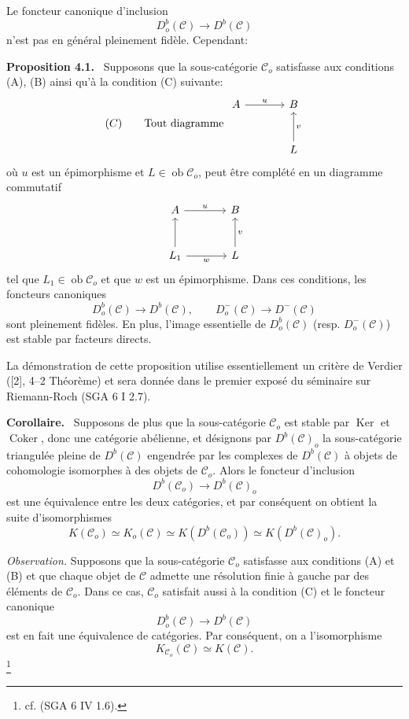 \documentclass[11pt]{article}
\newenvironment{statement}[1]{\par\medskip\noindent\textbf{#1.}\ }{\par\medskip}
\providecommand{\Ker}{\operatorname{Ker}}
\providecommand{\Coker}{\operatorname{Coker}}
\providecommand{\Ob}{\operatorname{ob}}
\providecommand{\cC}{\mathcal C}
\providecommand{\Ker}{\operatorname{Ker}}
\providecommand{\Coker}{\operatorname{Coker}}
\providecommand{\Ker}{\operatorname{Ker}}
\providecommand{\Coker}{\operatorname{Coker}}
\providecommand{\Ob}{\operatorname{ob}}
\providecommand{\cC}{\mathcal C}
\providecommand{\Ob}{\operatorname{Ob}}
\providecommand{\Ob}{\operatorname{ob}}
\providecommand{\Ob}{\operatorname{Ob}}
\begin{document}
Le foncteur canonique d'inclusion
\[
D_o^b(\cC)\longrightarrow D^b(\cC)
\]
n'est pas en général pleinement fidèle. Cependant:

\begin{statement}{Proposition 4.1}
Supposons que la sous-catégorie $\cC_o$ satisfasse aux conditions (A), (B) ainsi qu'à la condition (C) suivante:
\[
(C)\qquad
\text{Tout diagramme }
\begin{tikzcd}[column sep=large,row sep=large]
A \arrow[r,"u"]&B\\
&L \arrow[u,"v"']
\end{tikzcd}
\]
où $u$ est un épimorphisme et $L\in\Ob\cC_o$, peut être complété en un diagramme commutatif
\[
\begin{tikzcd}[column sep=large,row sep=large]
A \arrow[r,"u"]&B\\
L_1 \arrow[u] \arrow[r,"w"']&L \arrow[u,"v"']
\end{tikzcd}
\]
tel que $L_1\in\Ob\cC_o$ et que $w$ est un épimorphisme. Dans ces conditions, les foncteurs canoniques
\[
D_o^b(\cC)\longrightarrow D^b(\cC),\qquad
D_o^-(\cC)\longrightarrow D^-(\cC)
\]
sont pleinement fidèles. En plus, l'image essentielle de $D_o^b(\cC)$ (resp. $D_o^-(\cC)$) est stable par facteurs directs.
\end{statement}

La démonstration de cette proposition utilise essentiellement un critère de Verdier ([2], 4--2 Théorème) et sera donnée dans le premier exposé du séminaire sur Riemann-Roch (SGA 6 I 2.7).

\begin{statement}{Corollaire}
Supposons de plus que la sous-catégorie $\cC_o$ est stable par $\Ker$ et $\Coker$, donc une catégorie abélienne, et désignons par $D^b(\cC)_o$ la sous-catégorie triangulée pleine de $D^b(\cC)$ engendrée par les complexes de $D^b(\cC)$ à objets de cohomologie isomorphes à des objets de $\cC_o$. Alors le foncteur d'inclusion
\[
D^b(\cC_o)\longrightarrow D^b(\cC)_o
\]
est une équivalence entre les deux catégories, et par conséquent on obtient la suite d'isomorphismes
\[
K(\cC_o)\simeq K_o(\cC)\simeq K(D^b(\cC_o))\simeq K(D^b(\cC)_o).
\tag{*}
\]
\end{statement}

\emph{Observation.} Supposons que la sous-catégorie $\cC_o$ satisfasse aux conditions (A) et (B) et que chaque objet de $\cC$ admette une résolution finie à gauche par des éléments de $\cC_o$. Dans ce cas, $\cC_o$ satisfait aussi à la condition (C) et le foncteur canonique
\[
D_o^b(\cC)\longrightarrow D^b(\cC)
\]
est en fait une équivalence de catégories. Par conséquent, on a l'isomorphisme
\[
K_{\cC_o}(\cC)\simeq K(\cC).
\]
\footnote{cf. (SGA 6 IV 1.6).}
\end{document}
